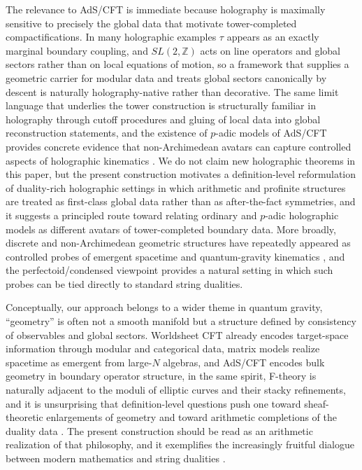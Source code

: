 \documentclass[11pt]{article}
\theoremstyle{remark}
\newcommand{\Z}{\mathbb{Z}}
\begin{document}
The relevance to AdS/CFT is immediate because holography is maximally sensitive to precisely the global data that motivate tower-completed compactifications. In many holographic examples \(\tau\) appears as an exactly marginal boundary coupling, and \(SL(2,\Z)\) acts on line operators and global sectors rather than on local equations of motion, so a framework that supplies a geometric carrier for modular data and treats global sectors canonically by descent is naturally holography-native rather than decorative. The same limit language that underlies the tower construction is structurally familiar in holography through cutoff procedures and gluing of local data into global reconstruction statements, and the existence of \(p\)-adic models of AdS/CFT provides concrete evidence that non-Archimedean avatars can capture controlled aspects of holographic kinematics \cite{Gubser2017, Heydeman2018}. We do not claim new holographic theorems in this paper, but the present construction motivates a definition-level reformulation of duality-rich holographic settings in which arithmetic and profinite structures are treated as first-class global data rather than as after-the-fact symmetries, and it suggests a principled route toward relating ordinary and \(p\)-adic holographic models as different avatars of tower-completed boundary data. More broadly, discrete and non-Archimedean geometric structures have repeatedly appeared as controlled probes of emergent spacetime and quantum-gravity kinematics \cite{Freidel2014, Chatterjee2018}, and the perfectoid/condensed viewpoint provides a natural setting in which such probes can be tied directly to standard string dualities.

Conceptually, our approach belongs to a wider theme in quantum gravity, ``geometry'' is often not a smooth manifold but a structure defined by consistency of observables and global sectors. Worldsheet CFT already encodes target-space information through modular and categorical data, matrix models realize spacetime as emergent from large-\(N\) algebras, and AdS/CFT encodes bulk geometry in boundary operator structure, in the same spirit, F-theory is naturally adjacent to the moduli of elliptic curves and their stacky refinements, and it is unsurprising that definition-level questions push one toward sheaf-theoretic enlargements of geometry and toward arithmetic completions of the duality data \cite{Cecotti:2020swampland}. The present construction should be read as an arithmetic realization of that philosophy, and it exemplifies the increasingly fruitful dialogue between modern mathematics and string dualities \cite{Witten1995b, KapustinWitten2007}.
\end{document}
